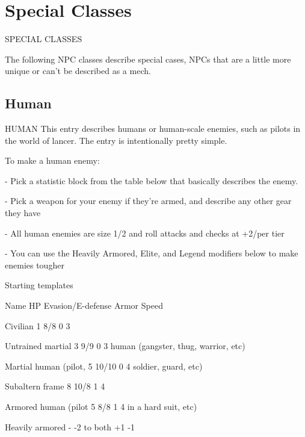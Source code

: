 \section{Special Classes}
      SPECIAL CLASSES  

The following NPC classes describe special cases, NPCs that are a little more unique or can’t be  
described as a mech.
 
\subsection{Human}
                                                HUMAN  
This entry describes humans or human-scale enemies, such as pilots in the world of lancer. The  
entry is intentionally pretty simple.
 

To make a human enemy:
 
            -   Pick a statistic block from the table below that basically describes the enemy. 
 
            -   Pick a weapon for your enemy if they’re armed, and describe any other gear they  
                have
 
            -   All human enemies are size 1/2 and roll attacks and checks at +2/per tier
 
            -   You can use the Heavily Armored, Elite, and Legend modifiers below to make  
                enemies tougher
 

                                           Starting templates  

 Name                        HP         Evasion/E-defense            Armor                   Speed 

 Civilian                    1          8/8                          0                       3 

 Untrained martial           3          9/9                          0                       3 
 human (gangster, thug,  
 warrior, etc) 

 Martial human (pilot,       5          10/10                        0                       4 
 soldier, guard, etc) 

 Subaltern frame             8          10/8                         1                       4 

 Armored human (pilot        5          8/8                          1                       4 
 in a hard suit, etc) 

 Heavily armored             -          -2 to both                   +1                      -1 

